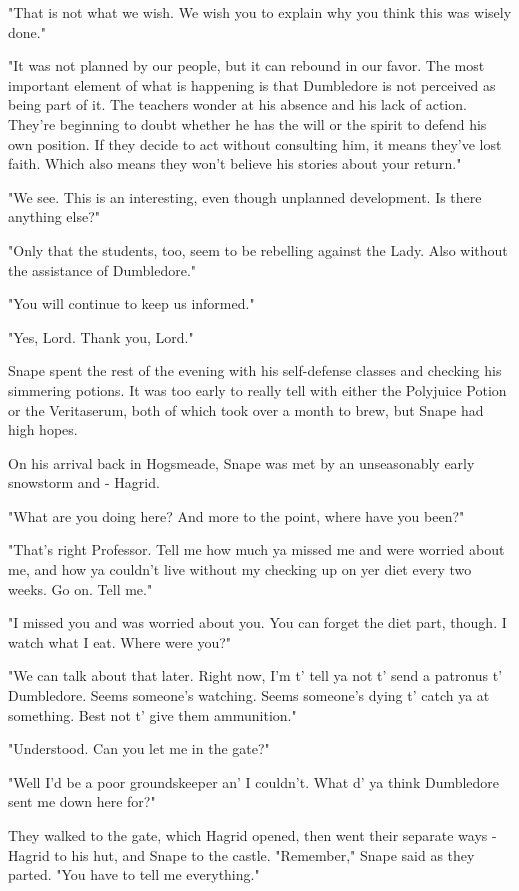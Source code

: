 "That is not what we wish. We wish you to explain why you think this was wisely done."

"It was not planned by our people, but it can rebound in our favor. The most important element of what is happening is that Dumbledore is not perceived as being part of it. The teachers wonder at his absence and his lack of action. They're beginning to doubt whether he has the will or the spirit to defend his own position. If they decide to act without consulting him, it means they've lost faith. Which also means they won't believe his stories about your return."

"We see. This is an interesting, even though unplanned development. Is there anything else?"

"Only that the students, too, seem to be rebelling against the Lady. Also without the assistance of Dumbledore."

"You will continue to keep us informed."

"Yes, Lord. Thank you, Lord."

Snape spent the rest of the evening with his self-defense classes and checking his simmering potions. It was too early to really tell with either the Polyjuice Potion or the Veritaserum, both of which took over a month to brew, but Snape had high hopes.

On his arrival back in Hogsmeade, Snape was met by an unseasonably early snowstorm and - Hagrid.

"What are you doing here? And more to the point, where have you been?"

"That's right Professor. Tell me how much ya missed me and were worried about me, and how ya couldn't live without my checking up on yer diet every two weeks. Go on. Tell me."

"I missed you and was worried about you. You can forget the diet part, though. I watch what I eat. Where were you?"

"We can talk about that later. Right now, I'm t' tell ya not t' send a patronus t' Dumbledore. Seems someone's watching. Seems someone's dying t' catch ya at something. Best not t' give them ammunition."

"Understood. Can you let me in the gate?"

"Well I'd be a poor groundskeeper an' I couldn't. What d' ya think Dumbledore sent me down here for?"

They walked to the gate, which Hagrid opened, then went their separate ways - Hagrid to his hut, and Snape to the castle. "Remember," Snape said as they parted. "You have to tell me everything."

